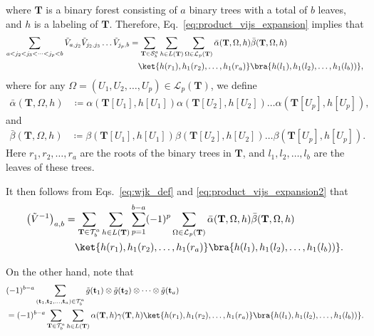 \documentclass[superscriptaddress,onecolumn,nofootinbib,longbibliography,a4paper,accepted=2026-09-29]{quantumarticle}
\theoremstyle{plain}
\theoremstyle{definition}
\numberwithin{thm}{section}
\numberwithin{assumption}{section}
\numberwithin{lemma}{section}
\numberwithin{prop}{section}
\numberwithin{cor}{section}
\numberwithin{definition}{section}
\numberwithin{rmk}{section}
\numberwithin{equation}{section}
\newcommand{\lrb}[1]{\left ( #1 \right )}
\newcommand{\defeq}{\coloneqq}
\newcommand{\mbt}{\mathbf{t}}
\newcommand{\mbf}{\mathbf{T}}
\begin{document}
where $\mbf$ is a binary forest consisting of $a$ binary trees with a total of $b$ leaves, and $h$ is a labeling of $\mbf$. Therefore, Eq.~\eqref{eq:product_vijs_expansion} implies that
\begin{align}
\sum_{a<j_2<j_3<\dots<j_p<b}  \tilde{V}_{a,j_2} \tilde{V}_{j_2, j_3} \dots \tilde{V}_{j_p, b}
    &= \sum_{\mbf \in \mathcal{S}^{a}_{b}}
    \sum_{h \in L(\mbf)}
    \sum_{\Omega \in \mathcal{L}_{p}(\mbf)}  \bar{\alpha}(\mbf, \Omega, h)
\bar{\beta}(\mbf, \Omega, h) \nonumber \\
&\quad  \ket{h(r_{1}), h_1(r_{2}), \dots, h_1(r_{a})}
\bra{h(l_{1}), h_1(l_{2}), \dots, h_1(l_{b}))},
\label{eq:product_vijs_expansion2}
\end{align}
where for any 
$\Omega=(U_1, U_2, \dots, U_p) \in \mathcal{L}_p(\mbf)$, we define
\begin{align}
\bar{\alpha}(\mbf, \Omega, h) &\defeq \alpha(\mbf[U_1], h[U_1])
\alpha(\mbf[U_2], h[U_2])
\dots 
\alpha(\mbf[U_p], h[U_p]), 
\end{align}
and
\begin{align}
\bar{\beta}(\mbf, \Omega, h) &\defeq \beta(\mbf[U_1], h[U_1])
\beta(\mbf[U_2], h[U_2])
\dots 
\beta(\mbf[U_p], h[U_p]).
\end{align}
Here $r_1, r_2, \dots, r_a$ are the roots of the binary trees in $\mbf$, and $l_1, l_2, \dots, l_b$ are the leaves of these trees.

It then follows from Eqs.~\eqref{eq:wjk_def} and \eqref{eq:product_vijs_expansion2} that
\begin{align}
\lrb{\tilde{V}^{-1}}_{a,b} &= 
\sum_{\mbf \in \mathcal{T}^{a}_{b}}
    \sum_{h \in L(\mbf)}
    \sum_{p=1}^{b-a} (-1)^p
    \sum_{\Omega \in \mathcal{L}_{p}(\mbf)}   \bar{\alpha}(\mbf, \Omega, h) \bar{\beta}(\mbf, \Omega, h)  \nonumber \\
&\quad \ket{h(r_{1}), h_1(r_{2}), \dots, h_1(r_a)}
\bra{h(l_{1}), h_1(l_{2}), \dots, h_1(l_b))}.
\label{eq:wjk_exp1}
\end{align}

On the other hand, note that
\begin{align}
    &(-1)^{b-a} \sum_{(\mbt_1,\mbt_2,\dots,\mbt_a) \in \mathcal{T}^a_b} \tilde{g}(\mbt_1) \otimes \tilde{g}(\mbt_2) \otimes \dots \otimes \tilde{g}(\mbt_a) \nonumber \\
    &=(-1)^{b-a} \sum_{\mbf \in \mathcal{T}^{a}_{b}}
    \sum_{h \in L(\mbf)} \alpha(\mbf, h) \gamma(\mbf, h) 
 \ket{h(r_{1}), h_1(r_{2}), \dots, h_1(r_{a})}
\bra{h(l_{1}), h_1(l_{2}), \dots, h_1(l_{b}))}.    
\label{eq:wjk_exp2}
\end{align}
\end{document}
